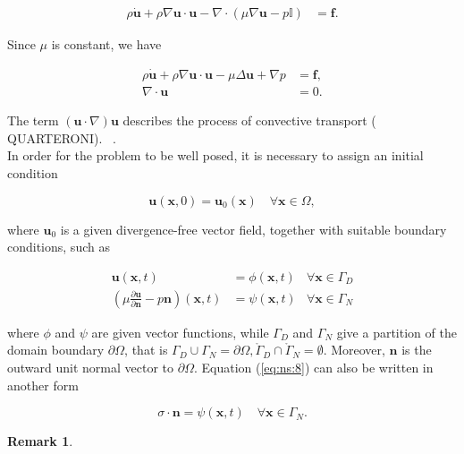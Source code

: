 \documentclass[11pt,a4paper,titlepage]{report}
\newtheorem*{remark}{Remark}
\begin{document}
\begin{align}
\rho \dot{\mathbf{u}} + \rho \nabla \mathbf{u} \cdot \mathbf{u} - \nabla \cdot (\mu \nabla \mathbf{u} - p \mathbb{I}) &= \mathbf{f}.
\end{align}

Since $\mu$ is constant, we have

\begin{align}
\rho \dot{\mathbf{u}} + \rho \nabla \mathbf{u} \cdot \mathbf{u} - \mu \Delta \mathbf{u} +  \nabla p &= \mathbf{f}, \\
\nabla \cdot \mathbf{u} &= 0.
\end{align}

The term $(\mathbf{u} \cdot \nabla)\mathbf{u}$ describes the process of convective transport (	QUARTERONI). ~\cite{}.\\
In order for the problem to be well posed, it is necessary to assign an initial condition

\begin{equation}
\mathbf{u} (\mathbf{x}, 0) = \mathbf{u}_0(\mathbf{x}) \quad \forall \mathbf{x} \in \Omega,
\end{equation}

where $\mathbf{u}_0$ is a given divergence-free vector field, together with suitable boundary conditions, such as

\begin{align}
\mathbf{u}(\mathbf{x},t) &= \phi (\mathbf{x}, t) & \forall \mathbf{x} \in \Gamma_D \\
\label{eq:ns:8}
\left( \mu \frac{\partial \mathbf{u}}{\partial \mathbf{n}} - p\mathbf{n} \right) (\mathbf{x},t) &= \psi(\mathbf{x},t) & \forall \mathbf{x} \in \Gamma_N
\end{align}


where $\phi$ and $\psi$ are given vector functions, while $\Gamma_D$ and $\Gamma_N$ give a partition of the domain boundary $\partial \Omega$, that is $\Gamma_D 	\cup \Gamma_N = \partial \Omega, \mathring{\Gamma}_D \cap \mathring{\Gamma}_N = \emptyset$. Moreover, $\mathbf{n}$ is the outward unit normal vector to $\partial \Omega$. Equation (\ref{eq:ns:8}) can also be written in another form

\begin{equation}
\sigma \cdot \mathbf{n} = \psi(\mathbf{x}, t)  \quad \forall \mathbf{x} \in \Gamma_N.
\end{equation}

\begin{remark}
\end{remark}
\end{document}
